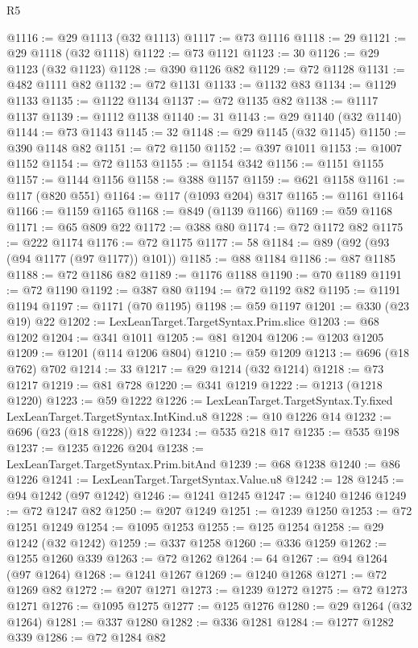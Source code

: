 \begin{lexlean}{R5}
\begin{coremodule}
{{{{{{{{{{{{{{{{{{{{{{{{{{{{{{{{{{{{{{{{{{{{{{{{{{{{{{{{{{{{{{{{{{{{{{{{{{{{{{{{{{{{{{{{{{{{@1116 := @29 @1113 (@32 @1113)
@1117 := @73 @1116
@1118 := 29
@1121 := @29 @1118 (@32 @1118)
@1122 := @73 @1121
@1123 := 30
@1126 := @29 @1123 (@32 @1123)
@1128 := @390 @1126 @82
@1129 := @72 @1128
@1131 := @482 @1111 @82
@1132 := @72 @1131
@1133 := @1132 @83
@1134 := @1129 @1133
@1135 := @1122 @1134
@1137 := @72 @1135 @82
@1138 := @1117 @1137
@1139 := @1112 @1138
@1140 := 31
@1143 := @29 @1140 (@32 @1140)
@1144 := @73 @1143
@1145 := 32
@1148 := @29 @1145 (@32 @1145)
@1150 := @390 @1148 @82
@1151 := @72 @1150
@1152 := @397 @1011
@1153 := @1007 @1152
@1154 := @72 @1153
@1155 := @1154 @342
@1156 := @1151 @1155
@1157 := @1144 @1156
@1158 := @388 @1157
@1159 := @621 @1158
@1161 := @117 (@820 @551)
@1164 := @117 (@1093 @204) @317
@1165 := @1161 @1164
@1166 := @1159 @1165
@1168 := @849 (@1139 @1166)
@1169 := @59 @1168
@1171 := @65 @809 @22
@1172 := @388 @80
@1174 := @72 @1172 @82
@1175 := @222 @1174
@1176 := @72 @1175
@1177 := 58
@1184 := @89 (@92 (@93 (@94 @1177 (@97 @1177)) @101))
@1185 := @88 @1184
@1186 := @87 @1185
@1188 := @72 @1186 @82
@1189 := @1176 @1188
@1190 := @70 @1189
@1191 := @72 @1190
@1192 := @387 @80
@1194 := @72 @1192 @82
@1195 := @1191 @1194
@1197 := @1171 (@70 @1195)
@1198 := @59 @1197
@1201 := @330 (@23 @19) @22
@1202 := LexLeanTarget.TargetSyntax.Prim.slice
@1203 := @68 @1202
@1204 := @341 @1011
@1205 := @81 @1204
@1206 := @1203 @1205
@1209 := @1201 (@114 @1206 @804)
@1210 := @59 @1209
@1213 := @696 (@18 @762) @702
@1214 := 33
@1217 := @29 @1214 (@32 @1214)
@1218 := @73 @1217
@1219 := @81 @728
@1220 := @341 @1219
@1222 := @1213 (@1218 @1220)
@1223 := @59 @1222
@1226 := LexLeanTarget.TargetSyntax.Ty.fixed LexLeanTarget.TargetSyntax.IntKind.u8
@1228 := @10 @1226 @14
@1232 := @696 (@23 (@18 @1228)) @22
@1234 := @535 @218 @17
@1235 := @535 @198
@1237 := @1235 @1226 @204
@1238 := LexLeanTarget.TargetSyntax.Prim.bitAnd
@1239 := @68 @1238
@1240 := @86 @1226
@1241 := LexLeanTarget.TargetSyntax.Value.u8
@1242 := 128
@1245 := @94 @1242 (@97 @1242)
@1246 := @1241 @1245
@1247 := @1240 @1246
@1249 := @72 @1247 @82
@1250 := @207 @1249
@1251 := @1239 @1250
@1253 := @72 @1251 @1249
@1254 := @1095 @1253
@1255 := @125 @1254
@1258 := @29 @1242 (@32 @1242)
@1259 := @337 @1258
@1260 := @336 @1259
@1262 := @1255 @1260 @339
@1263 := @72 @1262
@1264 := 64
@1267 := @94 @1264 (@97 @1264)
@1268 := @1241 @1267
@1269 := @1240 @1268
@1271 := @72 @1269 @82
@1272 := @207 @1271
@1273 := @1239 @1272
@1275 := @72 @1273 @1271
@1276 := @1095 @1275
@1277 := @125 @1276
@1280 := @29 @1264 (@32 @1264)
@1281 := @337 @1280
@1282 := @336 @1281
@1284 := @1277 @1282 @339
@1286 := @72 @1284 @82
}}}}}}}}}}}}}}}}}}}}}}}}}}}}}}}}}}}}}}}}}}}}}}}}}}}}}}}}}}}}}}}}}}}}}}}}}}}}}}}}}}}}}}}}}}}}
\end{coremodule}
\end{lexlean}
